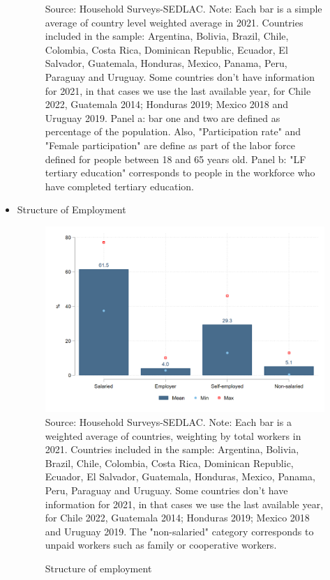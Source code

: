 \documentclass[english]{article}
\begin{document}
\begin{itemize}
\begin{figure}[!htb]
\footnotesize{Source: Household Surveys-SEDLAC.}
\footnotesize{Note: Each bar is a simple average of country level weighted average in 2021. Countries included in the sample: Argentina, Bolivia, Brazil, Chile, Colombia, Costa Rica, Dominican Republic, Ecuador, El Salvador, Guatemala, Honduras, Mexico, Panama, Peru, Paraguay and Uruguay. Some countries don’t have information for 2021, in that cases we use the last available year, for Chile 2022, Guatemala 2014; Honduras 2019; Mexico 2018 and Uruguay 2019. Panel a: bar one and two are defined as percentage of the population. Also, "Participation rate" and "Female participation" are define as part of the labor force defined for people between 18 and 65 years old. Panel b: "LF tertiary education" corresponds to people in the workforce who have completed tertiary education.}

\end{figure}
  
    \item Structure of Employment
    
        \begin{figure}[!htb]
        \justifying
        \caption{Structure of employment}     
        \includegraphics[scale=.3]{latex/figures/Snapshot/Structure of employment.png}
        \label{fig:employment}
        \footnotesize{Source: Household Surveys-SEDLAC.}
        \footnotesize{Note: Each bar is a weighted average of countries, weighting by total workers in 2021. Countries included in the sample: Argentina, Bolivia, Brazil, Chile, Colombia, Costa Rica, Dominican Republic, Ecuador, El Salvador, Guatemala, Honduras, Mexico, Panama, Peru, Paraguay and Uruguay. Some countries don’t have information for 2021, in that cases we use the last available year, for Chile 2022, Guatemala 2014; Honduras 2019; Mexico 2018 and Uruguay 2019. The "non-salaried" category corresponds to unpaid workers such as family or cooperative workers.}
        \end{figure}


\end{itemize}
\end{document}

